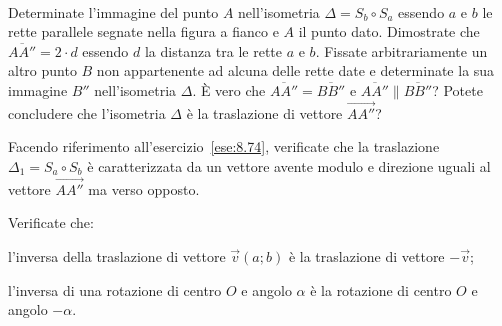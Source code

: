 \begin{esercizio}
\label{ese:}
~

\noindent\begin{minipage}{.70\textwidth}
Determinate l'immagine del punto $A$ nell'isometria $\Delta=S_b \circ 
S_a$ essendo $a$ e $b$ le rette parallele segnate nella figura a 
fianco e $A$ il punto dato. Dimostrate che $\overline{AA''}=2\cdot d$ 
essendo $d$ la distanza tra le rette $a$ e $b$.
Fissate arbitrariamente un altro punto $B$ non appartenente ad alcuna 
delle rette date e determinate la sua immagine $B''$ nell'isometria 
$\Delta$.
\`E vero che $\overline{AA''}=\overline{BB''}$ e $\overline{AA''} 
\parallel \overline{BB''}$? Potete concludere che l'isometria 
$\Delta$ è la traslazione di vettore $\overrightarrow{AA''}$?
\end{minipage} 
\begin{minipage}{.28\textwidth}
\begin{inaccessibleblock}
\begin{center}  \end{center}
\end{inaccessibleblock}
\end{minipage}
\end{esercizio}

% 

\begin{esercizio}
\label{ese:8.75} %
Facendo riferimento all'esercizio~\ref{ese:8.74}, verificate che la 
traslazione $\Delta_1 = S_a \circ S_b$ è caratterizzata da un vettore 
avente modulo e direzione uguali al vettore $\overrightarrow{AA''}$ 
ma verso opposto.
\end{esercizio}

\begin{esercizio}
\label{ese:8.82} %
Verificate che:
\begin{enumeratea}
\item l'inversa della traslazione di vettore $\vec{v}(a;b)$ è la 
traslazione di vettore $-\vec{v}$;
\item l'inversa di una rotazione di centro $O$ e angolo $\alpha$ è la 
rotazione di centro $O$ e angolo $-\alpha$.
\end{enumeratea}
\end{esercizio}

